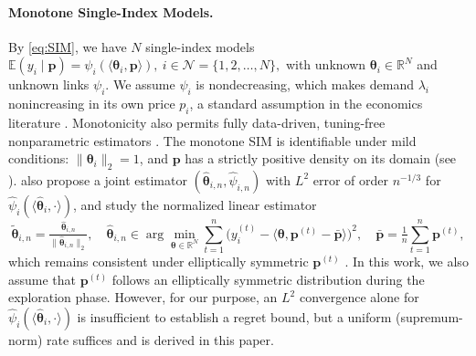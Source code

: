 \documentclass{article} %
\begin{document}
\paragraph{Monotone Single-Index Models.}\label{sec:MSIM}
By \cref{eq:SIM}, we have $N$ single-index models
\(
\mathbb{E}(y_i\mid \mathbf{p})=\psi_i(\langle\boldsymbol{\theta}_i,\mathbf{p}\rangle),
\ i\in\mathcal{N}=\{1,2,\dots, N\},
\)
with unknown $\boldsymbol{\theta}_i\in\mathbb{R}^N$ and unknown links $\psi_i$. We assume $\psi_i$ is nondecreasing, which makes demand $\lambda_i$ nonincreasing in its own price $p_i$, a standard assumption in the economics literature \citep{birge2024interfere, li2024lego}. Monotonicity also permits fully data-driven, tuning-free nonparametric estimators \citep{balabdaoui2019least}. The monotone SIM is identifiable under mild conditions: $\|\boldsymbol{\theta}_i\|_2=1$, and $\mathbf{p}$ has a strictly positive density on its domain (see \citet[Prop.~5.1]{balabdaoui2019least}). \citet{balabdaoui2019least} also propose a joint estimator $(\widehat{\boldsymbol{\theta}}_{i,n},\widehat{\psi}_{i,n})$ with $L^2$ error of order $n^{-1/3}$ for $\widehat{\psi}_i(\langle\widehat{\boldsymbol{\theta}}_i,\cdot\rangle)$, and study the normalized linear estimator
\begin{equation}\label{eq:linear_estimator}
\textstyle \widetilde{\boldsymbol{\theta}}_{i,n}=\tfrac{\widehat{\boldsymbol{\theta}}_{i,n}}{\|\widehat{\boldsymbol{\theta}}_{i,n}\|_2},\quad\widehat{\boldsymbol{\theta}}_{i,n}\in
\arg\min_{\boldsymbol{\theta}\in\mathbb{R}^N}
\sum_{t=1}^n\bigl(y_i^{(t)}-\langle\boldsymbol{\theta},\mathbf{p}^{(t)}-\bar{\mathbf{p}}\rangle\bigr)^2,\quad
\bar{\mathbf{p}}=\tfrac{1}{n}\sum_{t=1}^n \mathbf{p}^{(t)},
\end{equation}
which remains consistent under elliptically symmetric $\mathbf{p}^{(t)}$ \citep{brillinger2012generalized}. In this work, we also assume that $\mathbf{p}^{(t)}$ follows an elliptically symmetric distribution during the exploration phase. However, for our purpose, an $L^2$ convergence alone for $\widehat{\psi}_i(\langle\widehat{\boldsymbol{\theta}}_i,\cdot\rangle)$ is insufficient to establish a regret bound, but a uniform (supremum-norm) rate suffices and is derived in this paper.
\end{document}
